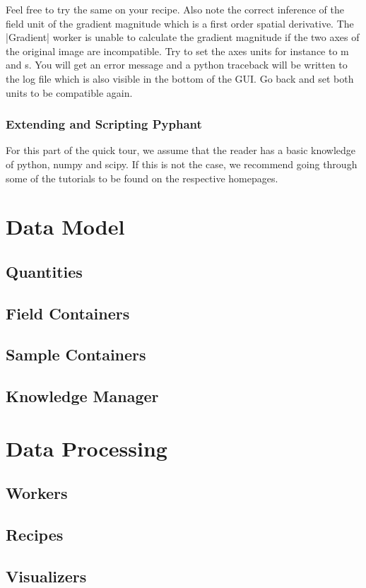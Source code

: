 \documentclass[a4paper]{article}
\begin{document}
Feel free to try the same on your recipe. Also note the correct
inference of the field unit of the gradient magnitude which is a first
order spatial derivative. The |Gradient| worker is unable to calculate
the gradient magnitude if the two axes of the original image are
incompatible. Try to set the axes units for instance to \si{m} and
\si{s}. You will get an error message and a python traceback will be
written to the log file which is also visible in the bottom of the
GUI. Go back and set both units to be compatible again.

\FloatBarrier
\subsubsection{Extending and Scripting Pyphant}
\label{sec:introduction_extending_and_scripting}

For this part of the quick tour, we assume that the reader has a basic
knowledge of python\cite{python}, numpy\cite{numpy} and
scipy\cite{scipy}. If this is not the case, we recommend going through
some of the tutorials to be found on the respective homepages.


\section{Data Model}
\label{sec:data_model}

\subsection{Quantities}
\label{sec:data_model_quantities}

\subsection{Field Containers}
\label{sec:data_model_fcs}

\subsection{Sample Containers}
\label{sec:data_model_scs}

\subsection{Knowledge Manager}
\label{sec:data_model_knowledge_manager}

\section{Data Processing}
\label{sec:data_processing}

\subsection{Workers}
\label{sec:data_processing_workers}

\subsection{Recipes}
\label{sec:data_processing_recipes}

\subsection{Visualizers}
\label{sec:data_processing_visualizers}




\clearpage

\printindex
\end{document}
